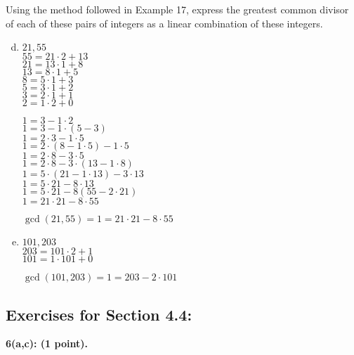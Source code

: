 \documentclass[12pt]{article}  %
\begin{document}
\noindent
Using the method followed in Example 17, express the greatest common divisor of each of these pairs of integers as a linear combination of these integers.
\begin{enumerate}[a)]\setcounter{enumi}{3}
    \item $21,55$\\
    $55=21\cdot2+13$\\
    $21=13\cdot1+8$\\
    $13=8\cdot1+5$\\
    $8=5\cdot1+3$\\
    $5=3\cdot1+2$\\
    $3=2\cdot1+1$\\
    $2=1\cdot2+0$
    
    \noindent
    $1=3-1\cdot2$\\
    $1=3-1\cdot(5-3)$\\
    $1=2\cdot3-1\cdot5$\\
    $1=2\cdot(8-1\cdot5)-1\cdot5$\\
    $1=2\cdot8-3\cdot5$\\
    $1=2\cdot8-3\cdot(13-1\cdot8)$\\
    $1=5\cdot(21-1\cdot13)-3\cdot13$\\
    $1=5\cdot21-8\cdot13$\\
    $1=5\cdot21-8(55-2\cdot21)$\\
    $1=21\cdot21-8\cdot55$
    
    \noindent
    $\gcd{(21,55)}=1=21\cdot21-8\cdot55$
    
    \item $101,203$\\
    $203=101\cdot2+1$\\
    $101=1\cdot101+0$
    
    \noindent
    $\gcd{(101,203)}=1=203-2\cdot101$
    
\end{enumerate}

\clearpage
\subsection*{Exercises for Section 4.4:}     

\noindent
{\bf 6(a,c): (1 point).}
\end{document}
